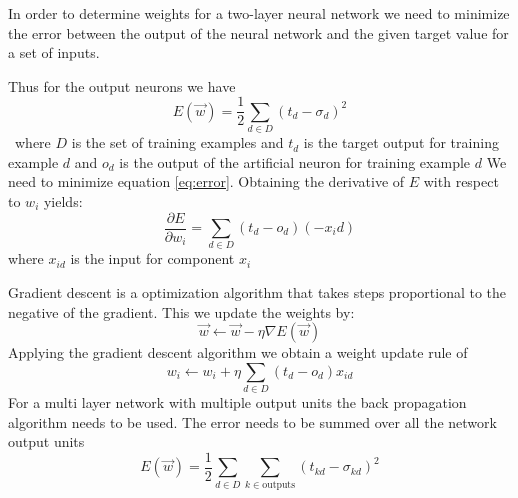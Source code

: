 In order to determine weights for a two-layer neural network we need to minimize the error between the output of the neural network and the given target value for a set of inputs. 

Thus for the output neurons we have
\begin{equation} E(\vec{w}) = \frac{1}{2} \sum_{d \in D}(t_d - \sigma_d)^2 \label{eq:error} \end{equation}\
where $D$ is the set of training examples and $t_d$ is the target output for training example $d$ and $o_d$ is the output of the artificial neuron for training example $d$
We need to minimize equation \ref{eq:error}.
Obtaining the derivative of $E$ with respect to $w_i$ yields:
\[ \frac{\partial E}{\partial w_i} = \sum_{d\in D}(t_d - o_d)(-x_id) \]
where $x_{id}$ is the input for component $x_i$

Gradient descent is a optimization algorithm that takes steps proportional to the negative of the gradient. This we update the weights by:
\[\vec{w} \leftarrow \vec{w} - \eta \nabla E(\vec{w}) \]
Applying the gradient descent algorithm we obtain a weight update rule of
\[ w_i \leftarrow w_i + \eta \sum_{d \in D} (t_d - o_d) x_{id} \]
For a multi layer network with multiple output units the back propagation algorithm needs to be used.
The error needs to be summed over all the network output units
\[E(\vec{w}) = \frac{1}{2} \sum_{d \in D} \sum_{k \in \text{outputs}} (t_{kd} - \sigma_{kd})^2 \]


